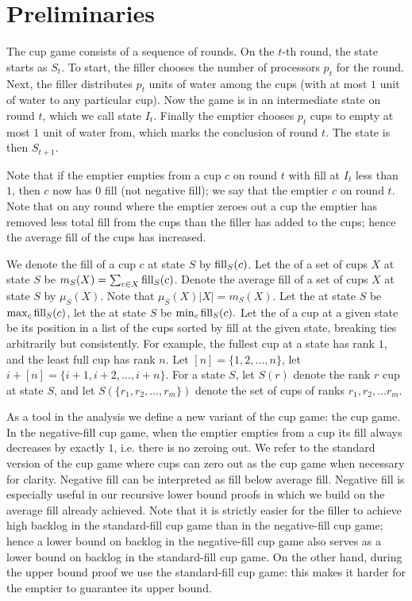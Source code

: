 \section{Preliminaries}\label{sec:prelims}
The cup game consists of a sequence of rounds. On the $t$-th
round, the state starts as $S_t$. To start, the filler chooses the number
of processors $p_t$ for the round. Next, the filler distributes
$p_t$ units of water among the cups (with at most $1$ unit of
water to any particular cup). Now the game is in an
intermediate state on round $t$, which we call state $I_t$.
Finally the emptier chooses $p_t$ cups to empty at most $1$ unit
of water from, which marks the conclusion of round $t$. The state
is then $S_{t+1}$.

Note that if the emptier empties from a cup $c$ on round $t$ with
fill at $I_t$ less than $1$, then $c$ now has $0$ fill (not
negative fill); we say that the emptier  $c$ on
round $t$. Note that on any round where the emptier zeroes out a
cup the emptier has removed less total fill from the cups than
the filler has added to the cups; hence the average fill of the
cups has increased.

We denote the fill of a cup $c$ at state $S$ by $\operatorname{\text{\textup{fill}}}_S(c)$. Let
the  of a set of cups $X$ at state $S$ be $m_S(X) =
\sum_{c\in X} \operatorname{\text{\textup{fill}}}_S(c)$. Denote the average fill of a set of
cups $X$ at state $S$ by $\mu_S(X)$. Note that $\mu_S(X) |X| =
m_S(X)$. Let the  at state $S$ be $\max_c
\operatorname{\text{\textup{fill}}}_S(c)$, let the  at state $S$ be $\min_c
\operatorname{\text{\textup{fill}}}_S(c).$
Let the  of a cup at a given state be its position in
a list of the cups sorted by fill at the given state, breaking
ties arbitrarily but consistently. For example, the fullest cup
at a state has rank $1$, and the least full cup has rank $n$. Let
$[n] = \{1,2,\ldots, n\}$, let $i+[n] = \{i+1, i+2, \ldots,
i+n\}$. For a state $S$, let $S(r)$ denote the rank $r$ cup at
state $S$, and let $S(\{r_1,r_2,\ldots, r_m\})$ denote the set of
cups of ranks $r_1, r_2,\ldots r_m$.

As a tool in the analysis we define a new variant of the cup
game: the  cup game. In the negative-fill cup
game, when the emptier empties from a cup its fill always
decreases by exactly $1$, i.e. there is no zeroing out. We refer
to the standard version of the cup game where cups can zero out
as the  cup game when necessary for clarity.
Negative fill can be interpreted as fill below average fill.
Negative fill is especially useful in our recursive lower bound
proofs in which we build on the average fill already achieved.
Note that it is strictly easier for the filler to achieve high backlog
in the standard-fill cup game than in the negative-fill cup game;
hence a lower bound on backlog in the negative-fill cup game
also serves as a lower bound on backlog in the standard-fill cup game.
On the other hand, during the upper bound
proof we use the standard-fill cup game: this makes it
harder for the emptier to guarantee its upper bound.

